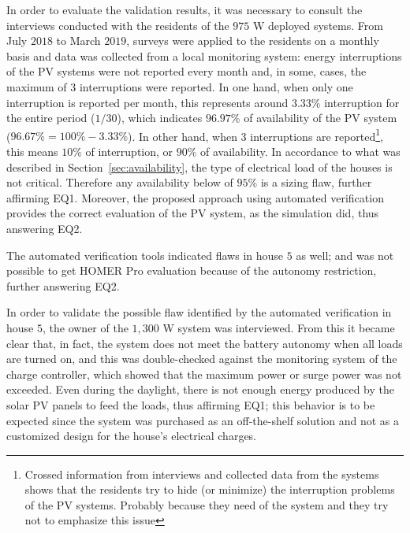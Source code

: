 In order to evaluate the validation results, it was necessary to consult the interviews conducted with the residents of the $975$ W deployed systems. From July $2018$ to March $2019$, surveys were applied to the residents on a monthly basis and data was collected from a local monitoring system: energy interruptions of the PV systems were not reported every month and, in some, cases, the maximum of 3 interruptions were reported. In one hand, when only one interruption is reported per month, this represents around $3.33$\% interruption for the entire period ($1/30$), which indicates $96.97$\% of availability of the PV system ($96.67\% = 100\%-3.33\%$). In other hand, when 3 interruptions are reported\footnote{Crossed information from interviews and collected data from the systems shows that the residents try to hide (or minimize) the interruption problems of the PV systems. Probably because they need of the system and they try not to emphasize this issue}, this means $10$\% of interruption, or $90$\% of availability. In accordance to what was described in Section~\ref{sec:availability}, the type of electrical load of the houses is not critical. Therefore any availability below of $95$\% is a sizing flaw, further affirming EQ1. Moreover, the proposed approach using automated verification provides the correct evaluation of the PV system, as the simulation did, thus answering EQ2.

The automated verification tools indicated flaws in house $5$ as well; and was not possible to get HOMER Pro evaluation because of the autonomy restriction, further answering EQ2.

In order to validate the possible flaw identified by the automated verification in house $5$, the owner of the $1,300$ W system was interviewed. From this it became clear that, in fact, the system does not meet the battery autonomy when all loads are turned on, and this was double-checked against the monitoring system of the charge controller, which showed that the maximum power or surge power was not exceeded. Even during the daylight, there is not enough energy produced by the solar PV panels to feed the loads, thus affirming EQ1; this behavior is to be expected since the system was purchased as an off-the-shelf solution and not as a customized design for the house's electrical charges. 

%
